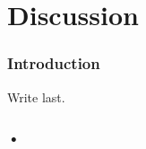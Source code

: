\section{Discussion} \label{sec:discussion}

\subsubsection{Introduction}

Write last.

\subsubsection{•}